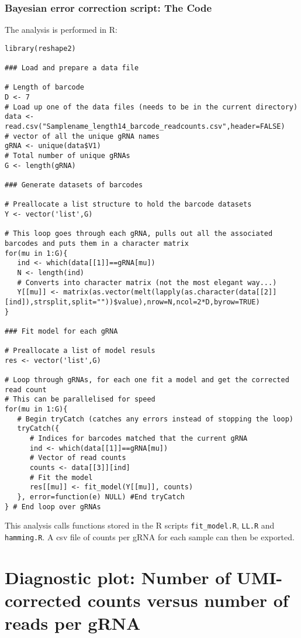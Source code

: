 \subsubsection{Bayesian error correction script: The Code}

The analysis is  performed in R:

\begin{small}\begin{lstlisting}
library(reshape2)

### Load and prepare a data file

# Length of barcode
D <- 7
# Load up one of the data files (needs to be in the current directory)
data <- read.csv("Samplename_length14_barcode_readcounts.csv",header=FALSE)
# vector of all the unique gRNA names
gRNA <- unique(data$V1)
# Total number of unique gRNAs
G <- length(gRNA)

### Generate datasets of barcodes

# Preallocate a list structure to hold the barcode datasets
Y <- vector('list',G)

# This loop goes through each gRNA, pulls out all the associated barcodes and puts them in a character matrix
for(mu in 1:G){
   ind <- which(data[[1]]==gRNA[mu])
   N <- length(ind)
   # Converts into character matrix (not the most elegant way...)
   Y[[mu]] <- matrix(as.vector(melt(lapply(as.character(data[[2]][ind]),strsplit,split=""))$value),nrow=N,ncol=2*D,byrow=TRUE)
}

### Fit model for each gRNA

# Preallocate a list of model resuls
res <- vector('list',G)

# Loop through gRNAs, for each one fit a model and get the corrected read count
# This can be parallelised for speed
for(mu in 1:G){
   # Begin tryCatch (catches any errors instead of stopping the loop)
   tryCatch({
      # Indices for barcodes matched that the current gRNA
      ind <- which(data[[1]]==gRNA[mu])
      # Vector of read counts
      counts <- data[[3]][ind]
      # Fit the model
      res[[mu]] <- fit_model(Y[[mu]], counts)
   }, error=function(e) NULL) #End tryCatch
} # End loop over gRNAs
\end{lstlisting}\end{small}

This analysis calls functions stored in the R scripts \verb|fit_model.R|, \verb|LL.R| and \verb|hamming.R|.
A csv file of counts per gRNA for each sample can then be exported.

\section{Diagnostic plot: Number of UMI-corrected counts versus number of reads per gRNA}
\label{subsec:Diagnostic_plot Counts vs reads}

